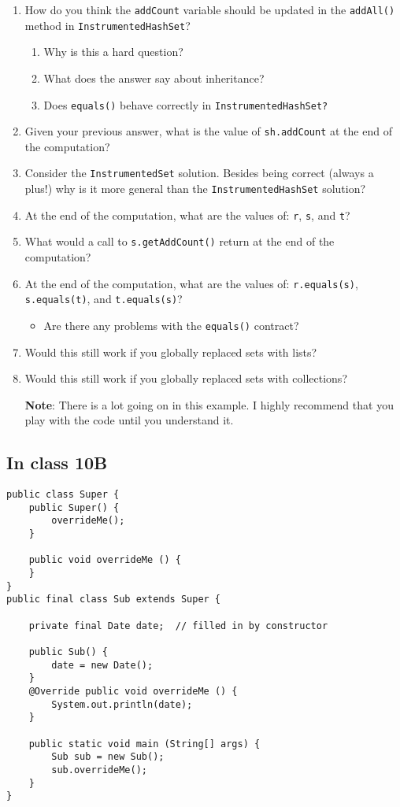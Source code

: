 \documentclass[11pt]{article}
\begin{document}
\begin{enumerate}
\item How do you think the \texttt{addCount} variable should be updated in the \texttt{addAll()} method in \texttt{InstrumentedHashSet}?
\begin{enumerate}
\item Why is this a hard question?
\item What does the answer say about inheritance?
\item Does \texttt{equals()} behave correctly in \texttt{InstrumentedHashSet?}
\end{enumerate}
\item Given your previous answer, what is the value of \texttt{sh.addCount} at the end of the computation?
\item Consider the \texttt{InstrumentedSet} solution. Besides being correct (always a plus!) why is it more general than the \texttt{InstrumentedHashSet} solution?
\item At the end of the computation, what are the values of: \texttt{r}, \texttt{s}, and \texttt{t}?
\item What would a call to \texttt{s.getAddCount()} return at the end of the computation?
\item At the end of the computation, what are the values of: \texttt{r.equals(s)}, \texttt{s.equals(t)}, and \texttt{t.equals(s)}?
\begin{itemize}
\item Are there any problems with the \texttt{equals()} contract?
\end{itemize}
\item Would this still work if you globally replaced sets with lists?
\item Would this still work if you globally replaced sets with collections?

\textbf{Note}: There is a lot going on in this example. I highly recommend that you play with the code until you understand it.
\end{enumerate}

\subsection{In class 10B}
\label{sec:org2036435}
\begin{verbatim}
public class Super {
    public Super() {
        overrideMe();
    }

    public void overrideMe () {
    }
}
public final class Sub extends Super {

    private final Date date;  // filled in by constructor

    public Sub() {
        date = new Date();
    }
    @Override public void overrideMe () {
        System.out.println(date);
    }

    public static void main (String[] args) {
        Sub sub = new Sub();
        sub.overrideMe();
    }
}
\end{verbatim}
\end{document}
